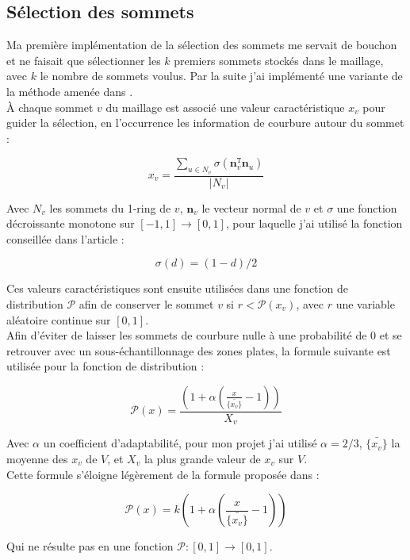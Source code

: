 \documentclass[12pt,a4paper]{article}
\begin{document}
\subsection{Sélection des sommets}\label{sampling}

Ma première implémentation de la sélection des sommets me servait de bouchon et ne faisait que sélectionner les $k$ premiers sommets stockés dans le maillage, avec $k$ le nombre de sommets voulus. Par la suite j'ai implémenté une variante de la méthode amenée dans \cite{BA:2009:MSS}.\\
\`A chaque sommet $v$ du maillage est associé une valeur caractéristique $x_v$ pour guider la sélection, en l'occurrence les information de courbure autour du sommet :

\[ x_v = \frac{\sum_{u \in N_v}\sigma(\textbf{n}_v^\texttt{T}\textbf{n}_u)}{|N_v|} \]

\noindent Avec $N_v$ les sommets du 1-ring de $v$, $\textbf{n}_v$ le vecteur normal de $v$ et $\sigma$ une fonction décroissante monotone sur $[-1,1] \rightarrow [0,1]$, pour laquelle j'ai utilisé la fonction conseillée dans l'article :

\[ \sigma(d) = (1-d)/2 \]

\clearpage

\noindent Ces valeurs caractéristiques sont ensuite utilisées dans une fonction de distribution $\mathcal{P}$ afin de conserver le sommet $v$ si $r < \mathcal{P}(x_v)$, avec $r$ une variable aléatoire continue sur $[0,1]$.\\ Afin d'éviter de laisser les sommets de courbure nulle à une probabilité de 0 et se retrouver avec un sous-échantillonnage des zones plates, la formule suivante est utilisée pour la fonction de distribution :

\Large{\[ \mathcal{P}(x) = \frac{\left(1+\alpha(\frac{x}{\bar{\{x_v\}}}-1)\right)}{X_v} \]}

\normalsize

\noindent Avec $\alpha$ un coefficient d'adaptabilité, pour mon projet j'ai utilisé $\alpha = 2/3$, $\bar{\{x_v\}}$ la moyenne des $x_v$ de $V$, et $X_v$ la plus grande valeur de $x_v$ sur $V$.\\
Cette formule s'éloigne légèrement de la formule proposée dans \cite{BA:2009:MSS} :

\Large{\[ \mathcal{P}(x) = k \left( 1+\alpha(\frac{x}{\bar{\{x_v\}}}-1) \right)  
\]}

\normalsize

\noindent Qui ne résulte pas en une fonction $\mathcal{P} : [0,1] \rightarrow [0,1]$.\\\\
\end{document}
